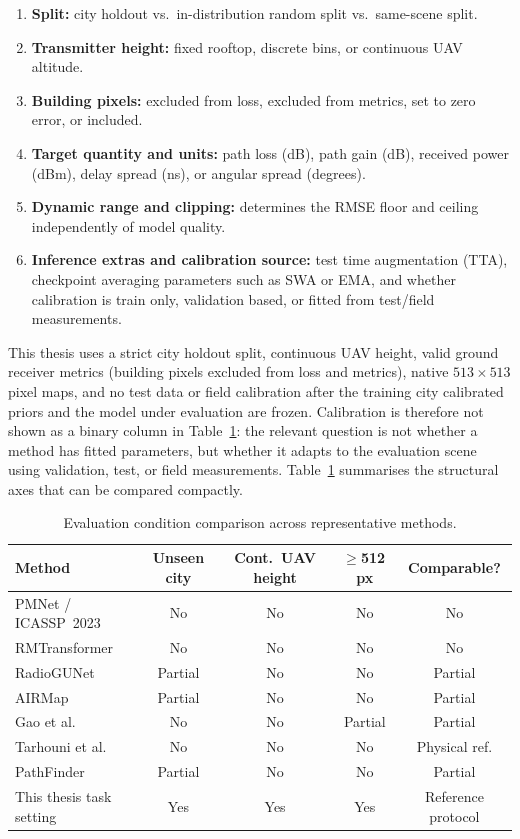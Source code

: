 \begin{enumerate}
  \item \textbf{Split:} city holdout vs.\ in-distribution random split vs.\
        same-scene split.
  \item \textbf{Transmitter height:} fixed rooftop, discrete bins, or
        continuous UAV altitude.
  \item \textbf{Building pixels:} excluded from loss, excluded from metrics,
        set to zero error, or included.
  \item \textbf{Target quantity and units:} path loss (dB), path gain (dB),
        received power (dBm), delay spread (ns), or angular spread (degrees).
  \item \textbf{Dynamic range and clipping:} determines the RMSE floor and
        ceiling independently of model quality.
  \item \textbf{Inference extras and calibration source:} test time
        augmentation (TTA), checkpoint averaging parameters such as SWA or EMA,
        and whether calibration is train only, validation based, or fitted from
        test/field measurements.
\end{enumerate}

This thesis uses a strict city holdout split, continuous UAV height, valid
ground receiver metrics (building pixels excluded from loss and metrics), native
$513 \times 513$ pixel maps, and no test data or field calibration after the
training city calibrated priors and the model under evaluation are frozen. Calibration is
therefore not shown as a binary column in Table~\ref{tab:fairness}: the relevant
question is not whether a method has fitted parameters, but whether it adapts
to the evaluation scene using validation, test, or field measurements.
Table~\ref{tab:fairness} summarises the structural axes that can be compared
compactly.

\begin{table}[ht]
\centering
\caption{Evaluation condition comparison across representative methods.}
\label{tab:fairness}
\small
\begin{tabularx}{\textwidth}{Xcccc}
\toprule
\textbf{Method} & \textbf{Unseen city} & \textbf{Cont.\ UAV height}
  & \textbf{$\ge$512\,px} & \textbf{Comparable?} \\
\midrule
PMNet / ICASSP~2023 \cite{pmnet_icassp2023} & No & No & No & No \\
RMTransformer \cite{rmtransformer2025} & No & No & No & No \\
RadioGUNet \cite{radiogunet2025} & Partial & No & No & Partial \\
AIRMap \cite{airmap2025} & Partial & No & No & Partial \\
Gao et al.\ \cite{gao2026} & No & No & Partial & Partial \\
Tarhouni et al.\ \cite{tarhouni2025} & No & No & No & Physical ref. \\
PathFinder \cite{pathfinder2025} & Partial & No & No & Partial \\
This thesis task setting & Yes & Yes & Yes & Reference protocol \\
\bottomrule
\end{tabularx}
\end{table}

